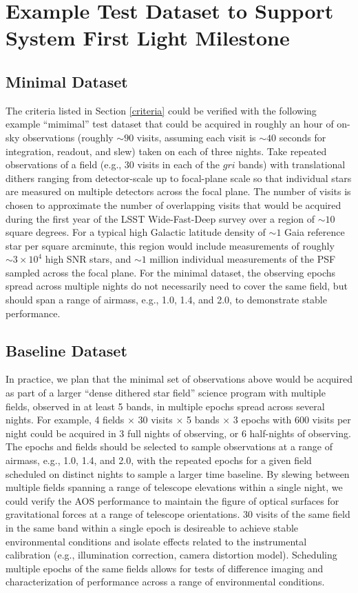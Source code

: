 \documentclass[SE,authoryear,toc]{lsstdoc}
\begin{document}
\section{Example Test Dataset to Support System First Light Milestone}
\label{dataset}

\subsection{Minimal Dataset}

The criteria listed in Section \ref{criteria} could be verified with the following example ``mimimal'' test dataset that could be acquired in roughly an hour of on-sky observations (roughly $\sim90$ visits, assuming each visit is $\sim40$ seconds for integration, readout, and slew) taken on each of three nights.
Take repeated observations of a field (e.g., 30 visits in each of the $gri$ bands) with translational dithers ranging from detector-scale up to focal-plane scale so that individual stars are measured on multiple detectors across the focal plane.
The number of visits is chosen to approximate the number of overlapping visits that would be acquired during the first year of the LSST Wide-Fast-Deep survey over a region of $\sim10$ square degrees.
For a typical high Galactic latitude density of $\sim1$ Gaia reference star per square arcminute, this region would include measurements of roughly $\sim3 \times 10^4$ high SNR stars, and $\sim1$ million individual measurements of the PSF sampled across the focal plane.
For the minimal dataset, the observing epochs spread across multiple nights do not necessarily need to cover the same field, but should span a range of airmass, e.g., 1.0, 1.4, and 2.0, to demonstrate stable performance.

\subsection{Baseline Dataset}

In practice, we plan that the minimal set of observations above would be acquired as part of a larger ``dense dithered star field'' science program with multiple fields, observed in at least 5 bands, in multiple epochs spread across several nights.
For example, 4 fields $\times$ 30 visits $\times$ 5 bands $\times$ 3 epochs with 600 visits per night could be acquired in 3 full nights of observing, or 6 half-nights of observing.
The epochs and fields should be selected to sample observations at a range of airmass, e.g., 1.0, 1.4, and 2.0, with the repeated epochs for a given field scheduled on distinct nights to sample a larger time baseline.
By slewing between multiple fields spanning a range of telescope elevations within a single night, we could verify the AOS performance to maintain the figure of optical surfaces for gravitational forces at a range of telescope orientations.
30 visits of the same field in the same band within a single epoch is desireable to achieve stable environmental conditions and isolate effects related to the instrumental calibration (e.g., illumination correction, camera distortion model).
Scheduling multiple epochs of the same fields allows for tests of difference imaging and characterization of performance across a range of environmental conditions.
\end{document}
